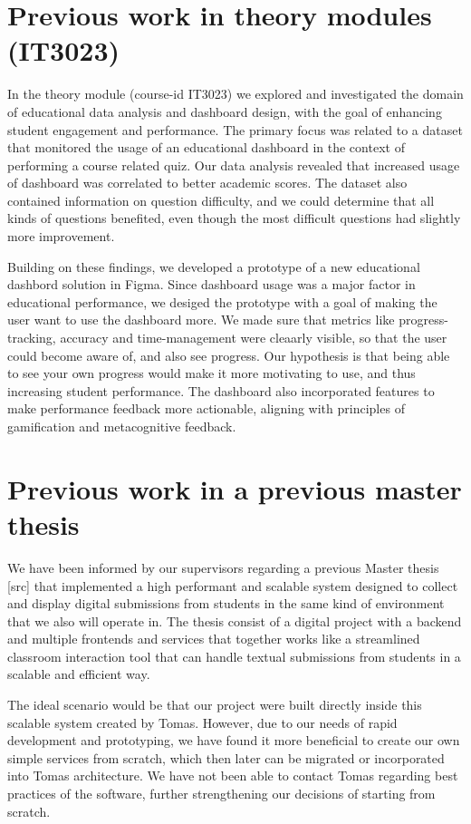 \section{Previous work in theory modules (IT3023)}
In the theory module (course-id IT3023) we explored and investigated the domain of educational data analysis and dashboard design, with the goal of enhancing student engagement and performance. The primary focus was related to a dataset that monitored the usage of an educational dashboard in the context of performing a course related quiz. Our data analysis revealed that increased usage of dashboard was correlated to better academic scores. The dataset also contained information on question difficulty, and we could determine that all kinds of questions benefited, even though the most difficult questions had slightly more improvement.

Building on these findings, we developed a prototype of a new educational dashbord solution in Figma. Since dashboard usage was a major factor in educational performance, we desiged the prototype with a goal of making the user want to use the dashboard more. We made sure that metrics like progress-tracking, accuracy and time-management were cleaarly visible, so that the user could become aware of, and also see progress. Our hypothesis is that being able to see your own progress would make it more motivating to use, and thus increasing student performance. The dashboard also incorporated features to make performance feedback more actionable, aligning with principles of gamification and metacognitive feedback.

\section{Previous work in a previous master thesis}
We have been informed by our supervisors regarding a previous Master thesis  [src] that implemented a high performant and scalable system designed to collect and display digital submissions from students in the same kind of environment that we also will operate in. The thesis consist of a digital project with a backend and multiple frontends and services that together works like a streamlined classroom interaction tool that can handle textual submissions from students in a scalable and efficient way.

The ideal scenario would be that our project were built directly inside this scalable system created by Tomas. However, due to our needs of rapid development and prototyping, we have found it more beneficial to create our own simple services from scratch, which then later can be migrated or incorporated into Tomas architecture. We have not been able to contact Tomas regarding best practices of the software, further strengthening our decisions of starting from scratch.

